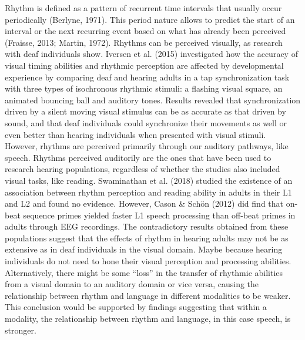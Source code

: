 \documentclass[english,man]{apa6}
\begin{document}
Rhythm is defined as a pattern of recurrent time intervals that usually occur periodically (Berlyne, 1971). This period nature allows to predict the start of an interval or the next recurring event based on what has already been perceived (Fraisse, 2013; Martin, 1972). Rhythms can be perceived visually, as research with deaf individuals show. Iversen et al. (2015) investigated how the accuracy of visual timing abilities and rhythmic perception are affected by developmental experience by comparing deaf and hearing adults in a tap synchronization task with three types of isochronous rhythmic stimuli: a flashing visual square, an animated bouncing ball and auditory tones. Results revealed that synchronization driven by a silent moving visual stimulus can be as accurate as that driven by sound, and that deaf individuals could synchronize their movements as well or even better than hearing individuals when presented with visual stimuli. However, rhythms are perceived primarily through our auditory pathways, like speech. Rhythms perceived auditorily are the ones that have been used to research hearing populations, regardless of whether the studies also included visual tasks, like reading. Swaminathan et al. (2018) studied the existence of an association between rhythm perception and reading ability in adults in their L1 and L2 and found no evidence. However, Cason \& Schön (2012) did find that on-beat sequence primes yielded faster L1 speech processing than off-beat primes in adults through EEG recordings. The contradictory results obtained from these populations suggest that the effects of rhythm in hearing adults may not be as extensive as in deaf individuals in the visual domain. Maybe because hearing individuals do not need to hone their visual perception and processing abilities. Alternatively, there might be some \enquote{loss} in the transfer of rhythmic abilities from a visual domain to an auditory domain or vice versa, causing the relationship between rhythm and language in different modalities to be weaker. This conclusion would be supported by findings suggesting that within a modality, the relationship between rhythm and language, in this case speech, is stronger.
\end{document}
